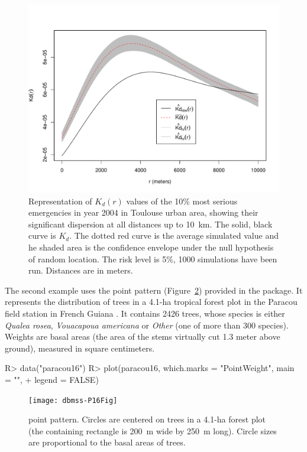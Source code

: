 \documentclass[nojss]{jss}
\begin{document}
\begin{figure}
\centering
\includegraphics{KdFig.pdf}
\caption{Representation of $K_d(r)$ values of the 10\% most serious emergencies in year 2004 in Toulouse urban area, showing their significant dispersion at all distances up to 10~km. The solid, black curve is  $K_d$. The dotted red curve is the average simulated value and he shaded area is the confidence envelope under the null hypothesis of random location. The risk level is 5\%, 1000 simulations have been run. Distances are in meters.}
\label{Kd}
\end{figure}

The second example uses the  point pattern (Figure~\ref{paracou16}) provided in the package. It represents the distribution of trees in a 4.1-ha tropical forest plot in the Paracou field station in French Guiana \citep{Gourlet2004}. It contains 2426 trees, whose species is either \emph{Qualea rosea}, \emph{Vouacapoua americana} or \emph{Other} (one of more than 300 species). Weights are basal areas (the area of the stems virtually cut 1.3 meter above ground), measured in square centimeters.

\begin{Schunk}
\begin{Sinput}
R> data("paracou16")
R> plot(paracou16, which.marks = "PointWeight", main = "", 
+      legend = FALSE)
\end{Sinput}
\end{Schunk}

\begin{figure}
\centering
\texttt{[image: dbmss-P16Fig]}
\caption{ point pattern. Circles are centered on trees in a 4.1-ha forest plot (the containing rectangle is 200~m wide by 250~m long). Circle sizes are proportional to the basal areas of trees.}
\label{paracou16}
\end{figure}
\end{document}
